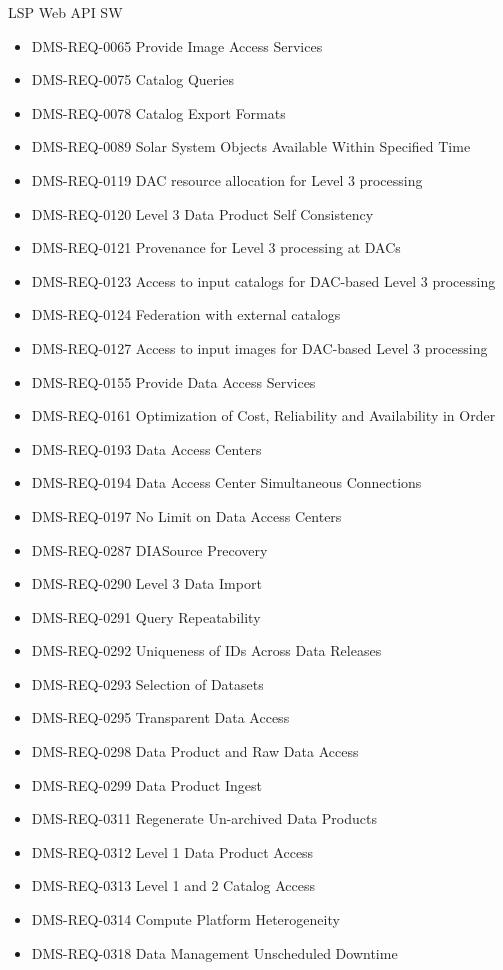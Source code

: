 LSP Web API SW \begin{itemize}
\item DMS-REQ-0065 Provide Image Access Services
\item DMS-REQ-0075 Catalog Queries
\item DMS-REQ-0078 Catalog Export Formats
\item DMS-REQ-0089 Solar System Objects Available Within Specified Time
\item DMS-REQ-0119 DAC resource allocation for Level 3 processing
\item DMS-REQ-0120 Level 3 Data Product Self Consistency
\item DMS-REQ-0121 Provenance for Level 3 processing at DACs
\item DMS-REQ-0123 Access to input catalogs for DAC-based Level 3 processing
\item DMS-REQ-0124 Federation with external catalogs
\item DMS-REQ-0127 Access to input images for DAC-based Level 3 processing
\item DMS-REQ-0155 Provide Data Access Services
\item DMS-REQ-0161 Optimization of Cost, Reliability and Availability in Order
\item DMS-REQ-0193 Data Access Centers
\item DMS-REQ-0194 Data Access Center Simultaneous Connections
\item DMS-REQ-0197 No Limit on Data Access Centers
\item DMS-REQ-0287 DIASource Precovery
\item DMS-REQ-0290 Level 3 Data Import
\item DMS-REQ-0291 Query Repeatability
\item DMS-REQ-0292 Uniqueness of IDs Across Data Releases
\item DMS-REQ-0293 Selection of Datasets
\item DMS-REQ-0295 Transparent Data Access
\item DMS-REQ-0298 Data Product and Raw Data Access
\item DMS-REQ-0299 Data Product Ingest
\item DMS-REQ-0311 Regenerate Un-archived Data Products
\item DMS-REQ-0312 Level 1 Data Product Access
\item DMS-REQ-0313 Level 1 and 2 Catalog Access
\item DMS-REQ-0314 Compute Platform Heterogeneity
\item DMS-REQ-0318 Data Management Unscheduled Downtime

\end{itemize}

